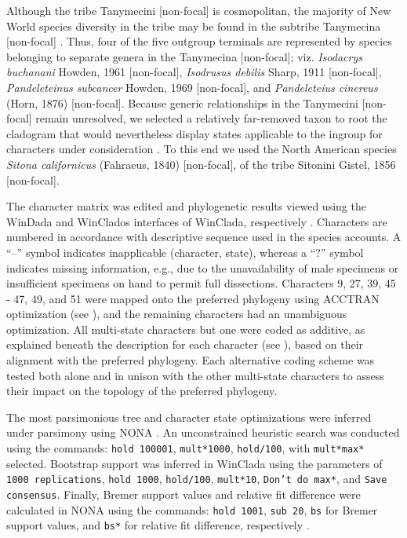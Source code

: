 \documentclass[fleqn,10pt,lineno]{wlpeerj} %
\begin{document}
		Although the tribe Tanymecini [non-focal] is cosmopolitan, the majority of New World species diversity in the tribe may be found in the subtribe Tanymecina [non-focal] \citep{alonso1999}.
		Thus, four of the five outgroup terminals are represented by species belonging to separate genera in the Tanymecina [non-focal]; viz. \textit{Isodacrys buchanani} Howden, 1961 [non-focal], \textit{Isodrusus debilis} Sharp, 1911 [non-focal], \textit{Pandeleteinus subcancer} Howden, 1969 [non-focal], and \textit{Pandeleteius cinereus} (Horn, 1876) [non-focal].
		Because generic relationships in the Tanymecini [non-focal] remain unresolved, we selected a relatively far-removed taxon to root the cladogram that would nevertheless display states applicable to the ingroup for characters under consideration \citep{rieppel2007, franz2014}.
		To this end we used the North American species \textit{Sitona californicus} (Fahraeus, 1840) [non-focal], of the tribe Sitonini Gistel, 1856 [non-focal].
		
		The character matrix was edited and phylogenetic results viewed using the WinDada and WinClados interfaces of WinClada, respectively \citep{nixon2002}.
		Characters are numbered in accordance with descriptive sequence used in the species accounts.
		A ``–'' symbol indicates inapplicable (character, state), whereas a ``?'' symbol indicates missing information, e.g., due to the unavailability of male specimens or insufficient specimens on hand to permit full dissections.
		Characters 9, 27, 39, 45 - 47, 49, and 51 were mapped onto the preferred phylogeny using ACCTRAN optimization (see \citealt{agnarsson2008}), and the remaining characters had an unambiguous optimization.
		All multi-state characters but one were coded as additive, as explained beneath the description for each character (see \textbf{}), based on their alignment with the preferred phylogeny.
		Each alternative coding scheme was tested both alone and in unison with the other multi-state characters to assess their impact on the topology of the preferred phylogeny.
		
		The most parsimonious tree and character state optimizations were inferred under parsimony using NONA \citep{goloboff1999}.
		An unconstrained heuristic search was conducted using the commands: \texttt{hold 100001}, \texttt{mult*1000}, \texttt{hold/100}, with \texttt{mult*max*} selected.
		Bootstrap support was inferred in WinClada using the parameters of \texttt{1000 replications}, \texttt{hold 1000}, \texttt{hold/100}, \texttt{mult*10}, \texttt{Don’t do max*}, and \texttt{Save consensus}.
		Finally, Bremer support values \citep{bremer1994} and relative fit difference \citep{goloboff2001} were calculated in NONA using the commands: \texttt{hold 1001}, \texttt{sub 20}, \texttt{bs} for Bremer support values, and \texttt{bs*} for relative fit difference, respectively \citep{goloboff2008}.
		
\end{document}
